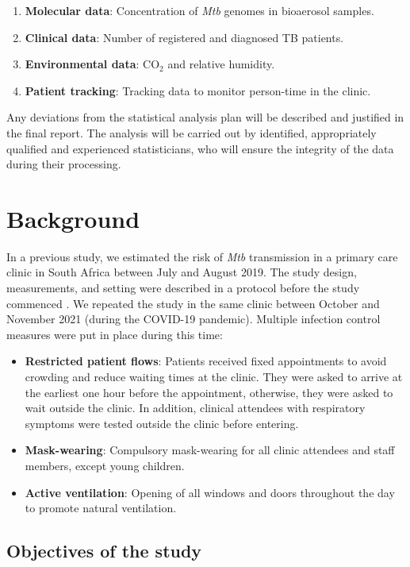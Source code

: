 \documentclass{article}
\begin{document}
\begin{enumerate}
    \item \textbf{Molecular data}: Concentration of \emph{Mtb} genomes in bioaerosol samples.
    \item \textbf{Clinical data}: Number of registered and diagnosed TB patients. 
    \item \textbf{Environmental data}: CO$_2$ and relative humidity.
    \item \textbf{Patient tracking}: Tracking data to monitor person-time in the clinic.
\end{enumerate}
 
Any deviations from the statistical analysis plan will be described and justified in the final report. The analysis will be carried out by identified, appropriately qualified and experienced statisticians, who will ensure the integrity of the data during their processing. 

\section{Background}

In a previous study, we estimated the risk of \emph{Mtb} transmission in a primary care clinic in South Africa between July and August 2019\cite{Zurcher2022JID}. The study design, measurements, and setting were described in a protocol before the study commenced \cite{Zurcher2020BMJ}. We repeated the study in the same clinic between October and November 2021 (during the COVID-19 pandemic). Multiple infection control measures were put in place during this time:

\begin{itemize}
    \item \textbf{Restricted patient flows}: Patients received fixed appointments to avoid crowding and reduce waiting times at the clinic.  They were asked to arrive at the earliest one hour before the appointment, otherwise, they were asked to wait outside the clinic. In addition, clinical attendees with respiratory symptoms were tested outside the clinic before entering.
    \item \textbf{Mask-wearing}: Compulsory mask-wearing for all clinic attendees and staff members, except young children.
    \item \textbf{Active ventilation}: Opening of all windows and doors throughout the day to promote natural ventilation.
\end{itemize}


\subsection{Objectives of the study}
\end{document}
